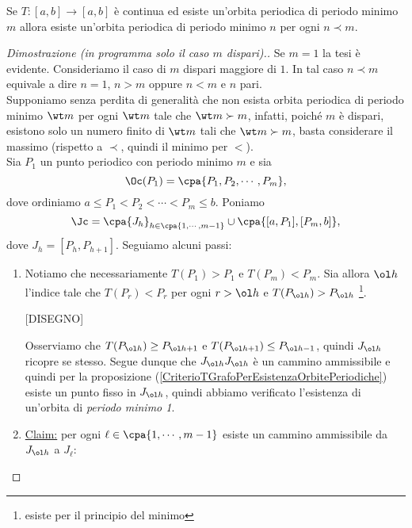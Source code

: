 \begin{theorem}[Sharkovsky]\label{TeoremaSharkovsky}
Se $T:[a,b]\to [a,b]$ \`e continua ed esiste un'orbita periodica di periodo minimo $m$ allora esiste un'orbita periodica di periodo minimo $n$ per ogni $n\prec m$.
\end{theorem}
\begin{proof}[Dimostrazione (in programma solo il caso $m$ dispari).]
Se $m=1$ la tesi \`e evidente. Consideriamo il caso di $m$ dispari maggiore di $1$. In tal caso $n\prec m$ equivale a dire $n=1$, $n>m$ oppure $n<m$ e $n$ pari.\\
Supponiamo senza perdita di generalit\`a che non esista orbita periodica di periodo minimo $\wt m$ per ogni $\wt m$ tale che $\wt m\succ m$, infatti, poich\'e $m$ \`e dispari, esistono solo un numero finito di $\wt m$ tali che $\wt m\succ m$, basta considerare il massimo (rispetto a $\prec$, quindi il minimo per $<$).\\
Sia $P_1$ un punto periodico con periodo minimo $m$ e sia
\[\Oc(P_1)=\cpa{P_1,P_2,\cdots, P_m},\]
dove ordiniamo $a \leq P_1 < P_2 < \cdots < P_m \leq b$. Poniamo
\[\Jc=\cpa{J_h}_{h\in\cpa{1,\cdots, m-1}}\cup \cpa{[a,P_1], [P_m,b]},\]
dove $J_h=[P_h,P_{h+1}]$. Seguiamo alcuni passi:
\setlength{\leftmargini}{0cm}
\begin{enumerate}
\item Notiamo che necessariamente $T(P_1)>P_1$ e $T(P_m)<P_m$. Sia allora $\ol h$ l'indice tale che $T(P_r)<P_r$ per ogni $r>\ol h$ e $T(P_{\ol h})>P_{\ol h}$ \footnote{esiste per il principio del minimo}. 

[DISEGNO]

Osserviamo che $T(P_{\ol h})\geq P_{\ol h+1}$ e $T(P_{\ol h+1})\leq P_{\ol h-1}$, quindi $J_{\ol h}$ ricopre se stesso. Segue dunque che $J_{\ol h}J_{\ol h}$ \`e un cammino ammissibile e quindi per la proposizione (\ref{CriterioTGrafoPerEsistenzaOrbitePeriodiche}) esiste un punto fisso in $J_{\ol h}$, quindi abbiamo verificato l'esistenza di un'orbita di \textit{periodo minimo 1}.

\item \underline{Claim:} per ogni $\ell\in \cpa{1,\cdots, m-1}$ esiste un cammino ammissibile da $J_{\ol h}$ a $J_{\ell}$:


\end{enumerate}
\end{proof}
